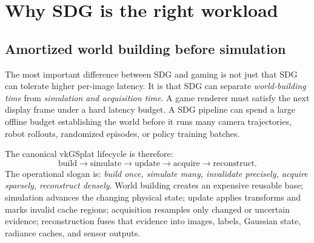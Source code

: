 \documentclass[10pt,journal,onecolumn]{IEEEtran}
\begin{document}
\section{Why SDG is the right workload}\label{sec:workload}

\subsection{Amortized world building before simulation}
\label{sec:world-building-lifecycle}

The most important difference between SDG and gaming is not just that SDG can
tolerate higher per-image latency. It is that SDG can separate
\emph{world-building time} from \emph{simulation and acquisition time}. A game
renderer must satisfy the next display frame under a hard latency budget. A SDG
pipeline can spend a large offline budget establishing the world before it runs
many camera trajectories, robot rollouts, randomized episodes, or policy
training batches.

The canonical vkGSplat lifecycle is therefore:
\[
\text{build} \rightarrow \text{simulate} \rightarrow \text{update}
\rightarrow \text{acquire} \rightarrow \text{reconstruct}.
\]
The operational slogan is: \emph{build once, simulate many, invalidate
precisely, acquire sparsely, reconstruct densely}. World building creates an
expensive reusable base; simulation advances the changing physical state; update
applies transforms and marks invalid cache regions; acquisition resamples only
changed or uncertain evidence; reconstruction fuses that evidence into images,
labels, Gaussian state, radiance caches, and sensor outputs.
\end{document}

